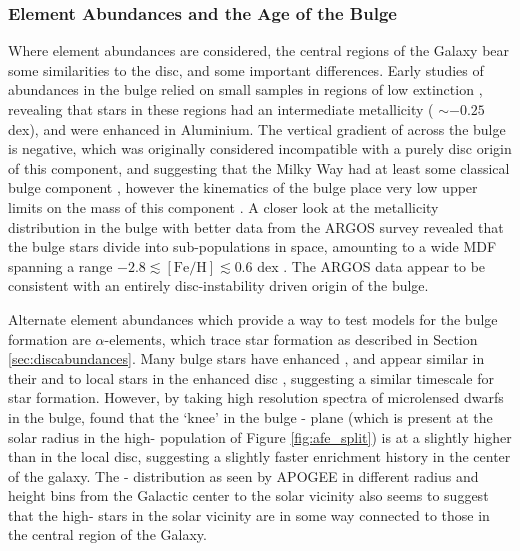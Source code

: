 \subsubsection{Element Abundances and the Age of the Bulge}
Where element abundances are considered, the central regions of the Galaxy bear some similarities to the disc, and some important differences. Early studies of abundances in the bulge relied on small samples in regions of low extinction \citep[e.g.][]{1994ApJS...91..749M}, revealing that stars in these regions had an intermediate metallicity (\feh{} $\sim -0.25$ dex), and were enhanced in Aluminium. The vertical gradient of \feh{} across the bulge is negative, which was originally considered incompatible with a purely disc origin of this component, and suggesting that the Milky Way had at least some classical bulge component \citep[e.g.][]{2008A&A...486..177Z}, however the kinematics of the bulge place very low upper limits on the mass of this component \citep[e.g. $\sim 8\%$;][]{2010ApJ...720L..72S}. A closer look at the metallicity distribution in the bulge with better data from the ARGOS survey revealed that the bulge stars divide into sub-populations in \feh{} space, amounting to a wide MDF spanning a range $-2.8 \lesssim \mathrm{[Fe/H]}\lesssim 0.6$ dex \citep{2013MNRAS.430..836N}. The ARGOS data appear to be consistent with an entirely disc-instability driven origin of the bulge.

Alternate element abundances which provide a way to test models for the bulge formation are $\alpha$-elements, which trace star formation as described in Section \ref{sec:discabundances}. Many bulge stars have enhanced \afe{}, and appear similar in their \afe{} and \feh{} to local stars in the \afe{} enhanced disc \citep{2010A&A...513A..35A,2015A&A...584A..46G}, suggesting a similar timescale for star formation. However, by taking high resolution spectra of microlensed dwarfs in the bulge, \citet{2013A&A...549A.147B} found that the `knee' in the bulge \afe{}-\feh{} plane (which is present at the solar radius in the high-\afe{} population of Figure \ref{fig:afe_split}) is at a slightly higher \feh{} than in the local disc, suggesting a slightly faster enrichment history in the center of the galaxy. The \afe{}-\feh{} distribution as seen by APOGEE in different radius and height bins from the Galactic center to the solar vicinity \citep{2016PASA...33...22N} also seems to suggest that the high-\afe{} stars in the solar vicinity are in some way connected to those in the central region of the Galaxy.

